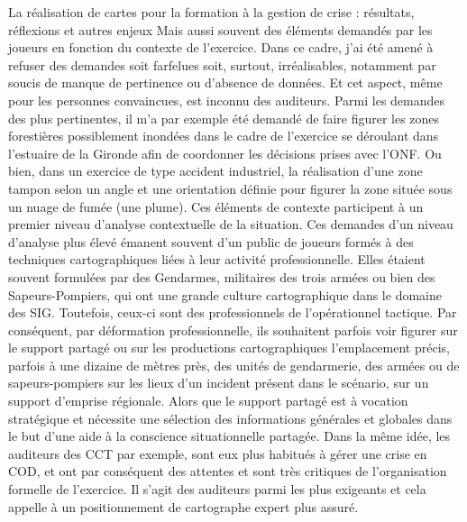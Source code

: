 \documentclass[10pt,a4paper]{report} %
\begin{document}
\begin{part}{La réalisation de cartes pour la formation à la gestion de crise : résultats, réflexions et autres enjeux}
Mais aussi souvent des éléments demandés par les joueurs en fonction du contexte de l’exercice. Dans ce cadre, j’ai été amené à refuser des demandes soit farfelues soit, surtout, irréalisables, notamment par soucis de manque de pertinence ou d’absence de données. Et cet aspect, même pour les personnes convaincues, est inconnu des auditeurs. Parmi les demandes des plus pertinentes, il m’a par exemple été demandé de faire figurer les zones forestières possiblement inondées dans le cadre de l’exercice se déroulant dans l’estuaire de la Gironde afin de coordonner les décisions prises avec l’ONF. Ou bien, dans un exercice de type accident industriel, la réalisation d’une zone tampon selon un angle et une orientation définie pour figurer la zone située sous un nuage de fumée (une plume). Ces éléments de contexte participent à un premier niveau d’analyse contextuelle de la situation. Ces demandes d’un niveau d’analyse plus élevé émanent souvent d’un public de joueurs formés à des techniques cartographiques liées à leur activité professionnelle. Elles étaient souvent formulées par des Gendarmes, militaires des trois armées ou bien des Sapeurs-Pompiers, qui ont une grande culture cartographique dans le domaine des SIG. Toutefois, ceux-ci sont des professionnels de l’opérationnel tactique. Par conséquent, par déformation professionnelle, ils souhaitent parfois voir figurer sur le support partagé ou sur les productions cartographiques l’emplacement précis, parfois à une dizaine de mètres près, des unités de gendarmerie, des armées ou de sapeurs-pompiers sur les lieux d’un incident présent dans le scénario, sur un support d’emprise régionale. Alors que le support partagé est à vocation stratégique et nécessite une sélection des informations générales et globales dans le but d’une aide à la conscience situationnelle partagée. Dans la même idée, les auditeurs des CCT par exemple, sont eux plus habitués à gérer une crise en COD, et ont par conséquent des attentes et sont très critiques de l’organisation formelle de l’exercice. Il s’agit des auditeurs parmi les plus exigeants et cela appelle à un positionnement de cartographe expert plus assuré.
\begin{figure}[!b]
    \centering

\end{figure}
\end{part}
\end{document}
